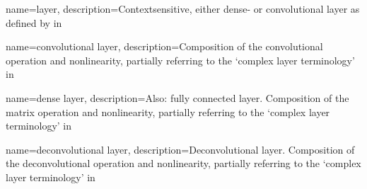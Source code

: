  {
    name={layer},
    description={Contextsensitive, either dense- or \gls{convolutional layer} 
    as defined by in}}

 {
    name={convolutional layer},
    description={Composition of the convolutional operation and nonlinearity, 
    partially referring to the `complex layer terminology' 
    in~\cite[341]{Goodfellow.2016}}
}

 {
    name={dense layer},
    description={Also: fully connected layer. Composition of the matrix operation and nonlinearity, partially referring to the `complex layer terminology' 
    in~\cite[341]{Goodfellow.2016}} 
}

 {
    name={deconvolutional layer},
    description={Deconvolutional layer. Composition of the deconvolutional 
    operation and nonlinearity, partially referring to the `complex layer 
    terminology' 
    in~\cite[341]{Goodfellow.2016}} 
}

